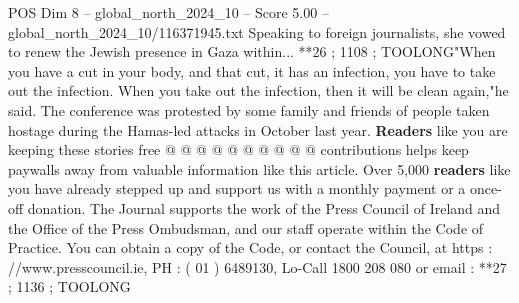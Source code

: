 \begin{textsample}{POS Dim 8 – global\_north\_2024\_10 – Score 5.00 – global\_north\_2024\_10/116371945.txt}
Speaking to foreign journalists, she vowed to renew the Jewish presence in Gaza within... **26 ; 1108 ; TOOLONG"When you have a cut in your body, and that cut, it has an infection, you have to take out the infection.
When you take out the infection, then it will be clean again,"he said.
The conference was protested by some family and friends of people taken hostage during the Hamas-led attacks in October last year. \textbf{Readers} like you are keeping these stories free @ @ @ @ @ @ @ @ @ @ contributions helps keep paywalls away from valuable information like this article.
Over 5,000 \textbf{readers} like you have already stepped up and support us with a monthly payment or a once-off donation.
The Journal supports the work of the Press Council of Ireland and the Office of the Press Ombudsman, and our staff operate within the Code of Practice.
You can obtain a copy of the Code, or contact the Council, at https : //www.presscouncil.ie, PH : ( 01 ) 6489130, Lo-Call 1800 208 080 or email : **27 ; 1136 ; TOOLONG

\end{textsample}
